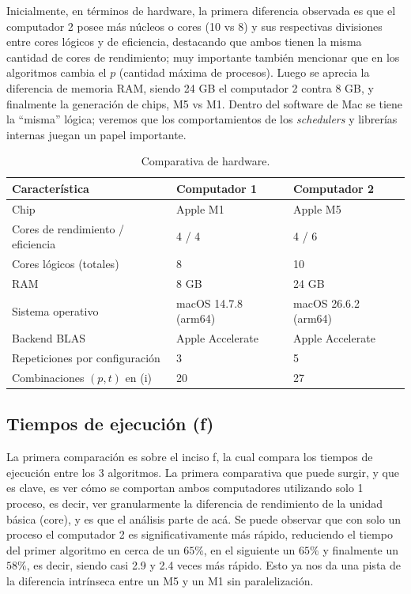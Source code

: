 \documentclass[12pt, letterpaper]{article}
\begin{document}
Inicialmente, en términos de hardware, la primera diferencia observada es que el computador 2 posee más
núcleos o cores (10 vs 8) y sus respectivas divisiones entre cores lógicos y de eficiencia, destacando que ambos tienen
la misma cantidad de cores de rendimiento; muy importante también mencionar que en los algoritmos cambia el $p$ (cantidad máxima de procesos).
Luego se aprecia la diferencia de memoria RAM,
siendo 24 GB el computador 2 contra 8 GB, y finalmente la generación de chips, M5 vs M1. Dentro del software de Mac
se tiene la ``misma'' lógica; veremos que los comportamientos de los \textit{schedulers} y librerías internas juegan un papel importante.

\begin{table}[H]
    \centering
    \small
    \begin{tabular}{|l|l|l|}
    \hline
    \textbf{Característica} & \textbf{Computador 1} & \textbf{Computador 2} \\
    \hline
    Chip & Apple M1 & Apple M5 \\
    Cores de rendimiento / eficiencia & 4 / 4 & 4 / 6 \\
    Cores lógicos (totales) & 8 & 10 \\
    RAM & 8 GB & 24 GB \\
    Sistema operativo & macOS 14.7.8 (arm64) & macOS 26.6.2 (arm64) \\
    Backend BLAS & Apple Accelerate & Apple Accelerate \\
    Repeticiones por configuración & 3 & 5 \\
    Combinaciones $(p,t)$ en (i) & 20 & 27 \\
    \hline
    \end{tabular}
    \caption{Comparativa de hardware.}
    \label{tab:hardware-j}
\end{table}

\subsection*{Tiempos de ejecución (f)}

La primera comparación es sobre el inciso f, la cual compara los tiempos de ejecución
entre los 3 algoritmos. La primera comparativa que puede surgir, y que es clave, es ver cómo
se comportan ambos computadores utilizando solo 1 proceso, es decir, ver granularmente la diferencia
de rendimiento de la unidad básica (core), y es que el análisis parte de acá. Se puede observar
que con solo un proceso el computador 2 es significativamente más rápido, reduciendo el tiempo del primer algoritmo
en cerca de un $65\%$, en el siguiente un $65\%$ y finalmente un $58\%$, es decir, siendo casi 2.9 y 2.4 veces más rápido.
Esto ya nos da una pista de la diferencia intrínseca entre un M5 y un M1 sin paralelización.
\end{document}
